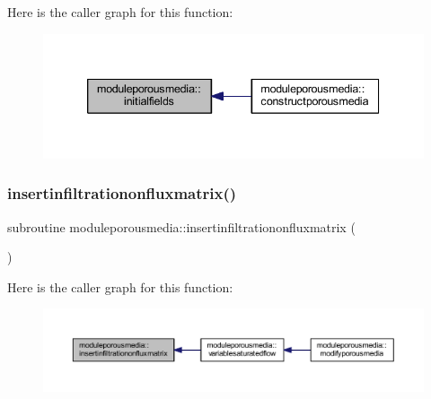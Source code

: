 Here is the caller graph for this function\+:\nopagebreak
\begin{figure}[H]
\begin{center}
\leavevmode
\includegraphics[width=339pt]{namespacemoduleporousmedia_a35c831104f825a9f11f297800f87ecab_icgraph}
\end{center}
\end{figure}
\mbox{\label{namespacemoduleporousmedia_a981859707e33f26a3f78d09d6f170f12}} 
\subsubsection{\texorpdfstring{insertinfiltrationonfluxmatrix()}{insertinfiltrationonfluxmatrix()}}
{\footnotesize\ttfamily subroutine moduleporousmedia\+::insertinfiltrationonfluxmatrix (\begin{DoxyParamCaption}{ }\end{DoxyParamCaption})\hspace{0.3cm}{\ttfamily [private]}}

Here is the caller graph for this function\+:\nopagebreak
\begin{figure}[H]
\begin{center}
\leavevmode
\includegraphics[width=350pt]{namespacemoduleporousmedia_a981859707e33f26a3f78d09d6f170f12_icgraph}
\end{center}
\end{figure}
\mbox{\label{namespacemoduleporousmedia_ad3dd92d2f8b726911dbb895f480b0725}} 
